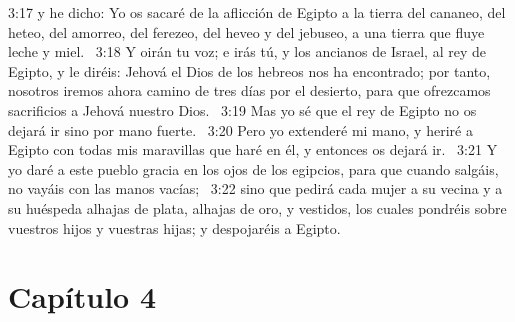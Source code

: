 3:17 y he dicho: Yo os sacaré de la aflicción de Egipto a la tierra del cananeo, del heteo, del amorreo, del ferezeo, del heveo y del jebuseo, a una tierra que fluye leche y miel.  
3:18 Y oirán tu voz; e irás tú, y los ancianos de Israel, al rey de Egipto, y le diréis: Jehová el Dios de los hebreos nos ha encontrado; por tanto, nosotros iremos ahora camino de tres días por el desierto, para que ofrezcamos sacrificios a Jehová nuestro Dios.  
3:19 Mas yo sé que el rey de Egipto no os dejará ir sino por mano fuerte.  
3:20 Pero yo extenderé mi mano, y heriré a Egipto con todas mis maravillas que haré en él, y entonces os dejará ir.  
3:21 Y yo daré a este pueblo gracia en los ojos de los egipcios, para que cuando salgáis, no vayáis con las manos vacías;  
3:22 sino que pedirá cada mujer a su vecina y a su huéspeda alhajas de plata, alhajas de oro, y vestidos, los cuales pondréis sobre vuestros hijos y vuestras hijas; y despojaréis a Egipto. 
\section*{Capítulo 4 }

